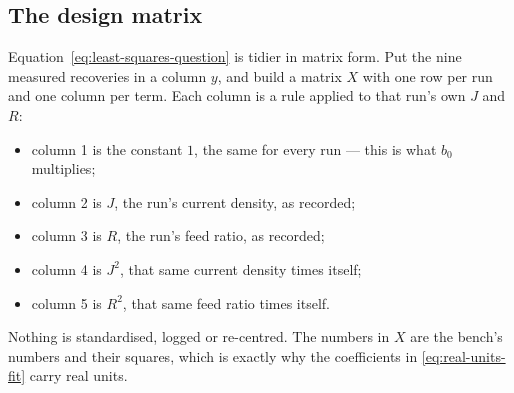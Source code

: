 \subsection{The design matrix}

Equation~\eqref{eq:least-squares-question} is tidier in matrix form. Put the nine measured
recoveries in a column $y$, and build a matrix $X$ with one row per run and one column per
term. Each column is a rule applied to that run's own $J$ and $R$:

\begin{itemize}[nosep]
  \item column 1 is the constant $1$, the same for every run --- this is what $b_0$ multiplies;
  \item column 2 is $J$, the run's current density, as recorded;
  \item column 3 is $R$, the run's feed ratio, as recorded;
  \item column 4 is $J^2$, that same current density times itself;
  \item column 5 is $R^2$, that same feed ratio times itself.
\end{itemize}

Nothing is standardised, logged or re-centred. The numbers in $X$ are the bench's numbers and
their squares, which is exactly why the coefficients in \eqref{eq:real-units-fit} carry real
units.

